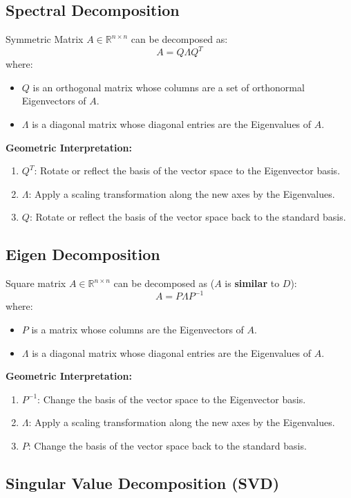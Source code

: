 \documentclass{article}
\begin{document}
\subsection{Spectral Decomposition}

Symmetric Matrix $A \in \mathbb{R}^{n \times n}$ can be decomposed as:
\[
    A = Q \Lambda Q^T
\]
where:
\begin{itemize}
    \item $Q$ is an orthogonal matrix whose columns are a set of orthonormal Eigenvectors of $A$.
    \item $\Lambda$ is a diagonal matrix whose diagonal entries are the Eigenvalues of $A$.
\end{itemize}
\textbf{Geometric Interpretation:}
\begin{enumerate}
    \item $Q^T$: Rotate or reflect the basis of the vector space to the Eigenvector basis.
    \item $\Lambda$: Apply a scaling transformation along the new axes by the Eigenvalues.
    \item $Q$: Rotate or reflect the basis of the vector space back to the standard basis.
\end{enumerate}

\subsection{Eigen Decomposition}

Square matrix $A \in \mathbb{R}^{n \times n}$ can be decomposed as ($A$ is \textbf{similar} to $D$):
\[
    A = P \Lambda P ^{-1}
\]
where:
\begin{itemize}
    \item $P$ is a matrix whose columns are the Eigenvectors of $A$.
    \item $\Lambda$ is a diagonal matrix whose diagonal entries are the Eigenvalues of $A$.
\end{itemize}
\textbf{Geometric Interpretation:}
\begin{enumerate}
    \item $P^{-1}$: Change the basis of the vector space to the Eigenvector basis.
    \item $\Lambda$: Apply a scaling transformation along the new axes by the Eigenvalues.
    \item $P$: Change the basis of the vector space back to the standard basis.
\end{enumerate}

\subsection{Singular Value Decomposition (SVD)}
\end{document}
